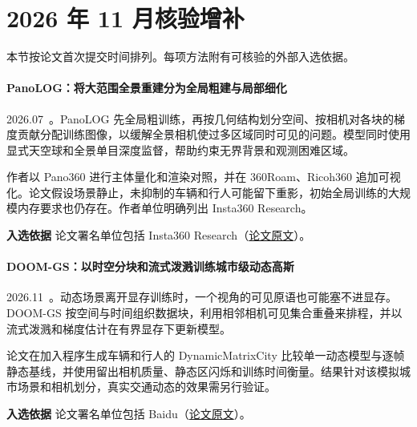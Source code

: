 \section{2026 年 11 月核验增补}

本节按论文首次提交时间排列。每项方法附有可核验的外部入选依据。

\paragraph{PanoLOG：将大范围全景重建分为全局粗建与局部细化}
2026.07~\cite{2607_08769}。PanoLOG 先全局粗训练，再按几何结构划分空间、按相机对各块的梯度贡献分配训练图像，以缓解全景相机使过多区域同时可见的问题。模型同时使用显式天空球和全景单目深度监督，帮助约束无界背景和观测困难区域。

作者以 Pano360 进行主体量化和渲染对照，并在 360Roam、Ricoh360 追加可视化。论文假设场景静止，未抑制的车辆和行人可能留下重影，初始全局训练的大规模内存要求也仍存在。作者单位明确列出 Insta360 Research。

\textbf{入选依据} 论文署名单位包括 Insta360 Research（\href{https://arxiv.org/html/2607.08769v1}{论文原文}）。

\paragraph{DOOM-GS：以时空分块和流式泼溅训练城市级动态高斯}
2026.11~\cite{2611_22805}。动态场景离开显存训练时，一个视角的可见原语也可能塞不进显存。DOOM-GS 按空间与时间组织数据块，利用相邻相机可见集合重叠来排程，并以流式泼溅和梯度估计在有界显存下更新模型。

论文在加入程序生成车辆和行人的 DynamicMatrixCity 比较单一动态模型与逐帧静态基线，并使用留出相机质量、静态区闪烁和训练时间衡量。结果针对该模拟城市场景和相机划分，真实交通动态的效果需另行验证。

\textbf{入选依据} 论文署名单位包括 Baidu（\href{https://arxiv.org/abs/2611.22805}{论文原文}）。
